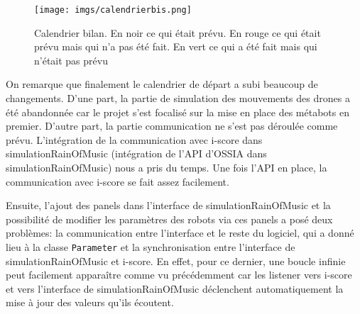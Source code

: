 \begin{figure}[H]
  \begin{center}
  	\texttt{[image: imgs/calendrierbis.png]}
  	\caption{Calendrier bilan. En noir ce qui était prévu. En rouge ce qui était prévu mais qui n'a pas été fait. En vert ce qui a été fait mais qui n'était pas prévu}
  	\label{cal}
  \end{center}
\end{figure}

On remarque que finalement le calendrier de départ a subi beaucoup de changements. D'une part, la partie de simulation des mouvements des drones a été abandonnée car le projet s'est focalisé sur la mise en place des métabots en premier. D'autre part, la partie communication ne s'est pas déroulée comme prévu. L'intégration de la communication avec i-score dans simulationRainOfMusic (intégration de l'API d'OSSIA dans simulationRainOfMusic) nous a pris du temps. Une fois l'API en place, la communication avec i-score se fait assez facilement. 

Ensuite, l'ajout des panels dans l'interface de simulationRainOfMusic et la possibilité de modifier les paramètres des robots via ces panels a posé deux problèmes: la communication entre l'interface et le reste du logiciel, qui a donné lieu à la classe \verb|Parameter| et la synchronisation entre l'interface de simulationRainOfMusic et i-score. En effet, pour ce dernier, une boucle infinie peut facilement apparaître comme vu précédemment car les listener vers i-score et vers l'interface de simulationRainOfMusic déclenchent automatiquement la mise à jour des valeurs qu'ils écoutent. 

